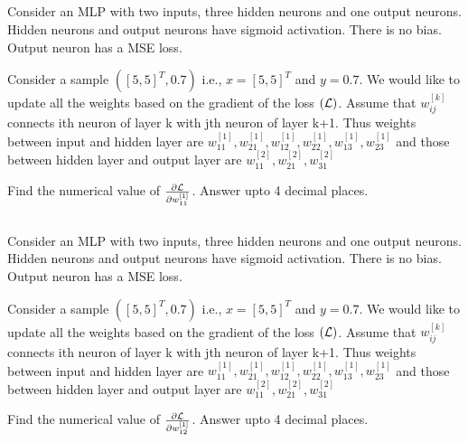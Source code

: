 \begin{frame}
\section{}
Consider an MLP with two inputs, three hidden neurons and one output neurons. Hidden neurons and output neurons have sigmoid activation. There is no bias. Output neuron has a MSE loss.

Consider a sample $([5,5]^T,0.7)$ i.e., $x = [5,5]^T$ and $y=0.7$. We would like to update all the weights based on the gradient of the loss $({\cal L})$. Assume that $w_{ij}^{[k]}$ connects ith neuron of layer k with jth neuron of layer k+1. Thus weights between input and hidden layer are $w_{11}^{[1]}, w_{21}^{[1]}, w_{12}^{[1]}, w_{22}^{[1]}, w_{13}^{[1]}, w_{23}^{[1]}$ and those between hidden layer and output layer are $w_{11}^{[2]}, w_{21}^{[2]}, w_{31}^{[2]}$

Find the numerical value of $\frac{\partial \cal L}{\partial w_{11}^{[1]}}$. Answer upto 4 decimal places.



\end{frame}


\begin{frame}
\section{}
Consider an MLP with two inputs, three hidden neurons and one output neurons. Hidden neurons and output neurons have sigmoid activation. There is no bias. Output neuron has a MSE loss.

Consider a sample $([5,5]^T,0.7)$ i.e., $x = [5,5]^T$ and $y=0.7$. We would like to update all the weights based on the gradient of the loss $({\cal L})$. Assume that $w_{ij}^{[k]}$ connects ith neuron of layer k with jth neuron of layer k+1. Thus weights between input and hidden layer are $w_{11}^{[1]}, w_{21}^{[1]}, w_{12}^{[1]}, w_{22}^{[1]}, w_{13}^{[1]}, w_{23}^{[1]}$ and those between hidden layer and output layer are $w_{11}^{[2]}, w_{21}^{[2]}, w_{31}^{[2]}$

Find the numerical value of $\frac{\partial \cal L}{\partial w_{12}^{[1]}}$. Answer upto 4 decimal places.



\end{frame}



